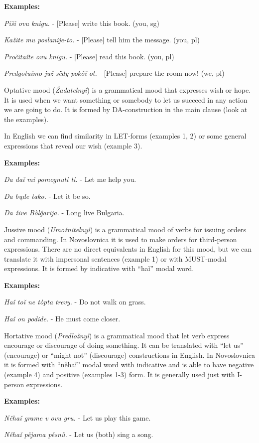 \textbf{Examples:}

\textit{Piši ovu knigu.} - [Please] write this book. (you, sg)

\textit{Kažite mu poslanije-to.} - [Please] tell him the message. (you, pl)

\textit{Pročitaǐte ovu knigu.} - [Please] read this book. (you, pl)

\textit{Predgotuǐmo juž sëdy pokôǐ-ot.} - [Please] prepare the room now! (we, pl)

Optative mood (\textit{Žadatelnyǐ}) is a grammatical mood that expresses wish or hope. It is used when we want something or somebody to let us succeed in any action we are going to do. It is formed by DA-construction in the main clause (look at the examples). 

In English we can find similarity in LET-forms (examples 1, 2) or some general expressions that reveal our wish (example 3).

\textbf{Examples:}

\textit{Da daǐ mi pomognuti ti.} - Let me help you.

\textit{Da bųde tako.} - Let it be so.

\textit{Da žive Bòlĝarija.} - Long live Bulgaria.

Jussive mood (\textit{Umožnitelnyǐ}) is a grammatical mood of verbs for issuing orders and commanding. In Novoslovnica it is used to make orders for third-person expressions. There are no direct equivalents in English for this mood, but we can translate it with impersonal sentences (example 1) or with MUST-modal expressions. It is formed by indicative with “haǐ” modal word.

\textbf{Examples:}

\textit{Haǐ toǐ ne tòpta trevy.} - Do not walk on grass.

\textit{Haǐ on podide.} - He must come closer.

Hortative mood (\textit{Predložnyǐ})  is a grammatical mood that let verb express encourage or discourage of doing something. It can be translated with “let us” (encourage) or “might not” (discourage) constructions in English. In Novoslovnica it is formed with “něhaǐ” modal word with indicative and is able to have negative (example 4) and positive (examples 1-3) form. It is generally used just with I-person expressions.

\textbf{Examples:}

\textit{Něhaǐ grame v ovu gru.} - Let us play this game.

\textit{Něhaǐ pějama pěsnü.} - Let us (both) sing a song.

